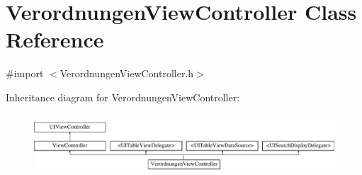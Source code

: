 \hypertarget{interface_verordnungen_view_controller}{}\section{Verordnungen\+View\+Controller Class Reference}
\label{interface_verordnungen_view_controller}


{\ttfamily \#import $<$Verordnungen\+View\+Controller.\+h$>$}

Inheritance diagram for Verordnungen\+View\+Controller\+:\begin{figure}[H]
\begin{center}
\leavevmode
\includegraphics[height=2.258065cm]{interface_verordnungen_view_controller}
\end{center}
\end{figure}
